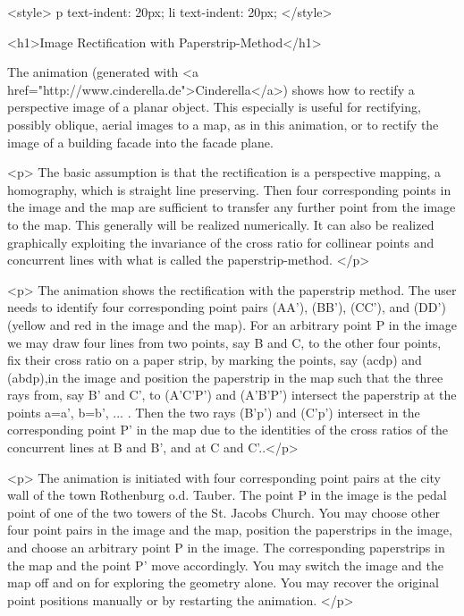 <style>
p {
  text-indent: 20px;
}
li {
  text-indent: 20px;
}
</style>

<h1>Image Rectification with Paperstrip-Method</h1> 


The animation (generated with <a
    href="http://www.cinderella.de">Cinderella</a>) shows how to rectify a perspective image of a planar object. This especially is useful for rectifying, possibly oblique, aerial images to a map, as in this animation, or to rectify the image of a building facade into the facade plane. 
    
<p>  The basic assumption is that the rectification is a perspective mapping, a homography,  which is straight line preserving. Then four corresponding points in the image and the map are sufficient to transfer any further point from the image to the map. This generally will be realized numerically. It can also be realized graphically exploiting the invariance of the cross ratio for collinear points and concurrent lines with what is called the paperstrip-method. </p>
    

<p> The animation shows the rectification with the paperstrip method. The user needs to identify four corresponding point pairs (AA'), (BB'), (CC'), and (DD') (yellow and red in the image and the map). For an arbitrary point P in the image we may draw four lines from two points, say B and C, to the other four points, fix their cross ratio on a paper strip, by marking the points, say (acdp) and (abdp),in the image and position the paperstrip in the map such that the three rays from, say B' and C', to (A'C'P') and (A'B'P') intersect the paperstrip at the points a=a', b=b', ... . Then the two rays (B'p') and (C'p') intersect in the corresponding point P' in the map due to the identities of the cross ratios of the concurrent lines at B and B', and at C and C'..</p>    
    
<p> The animation is initiated with four corresponding point pairs at the city wall of the town Rothenburg o.d. Tauber. The point P in the image is the pedal point of one of the two towers of the St. Jacobs Church. You may choose other four point pairs in the image and the map, position the paperstrips in the image, and choose an arbitrary point P in the image. The corresponding paperstrips in the map and the point P' move accordingly.  You may switch the image and the map off and on for exploring the geometry alone. You may recover the original point positions manually or by restarting the animation. </p>

    
    

